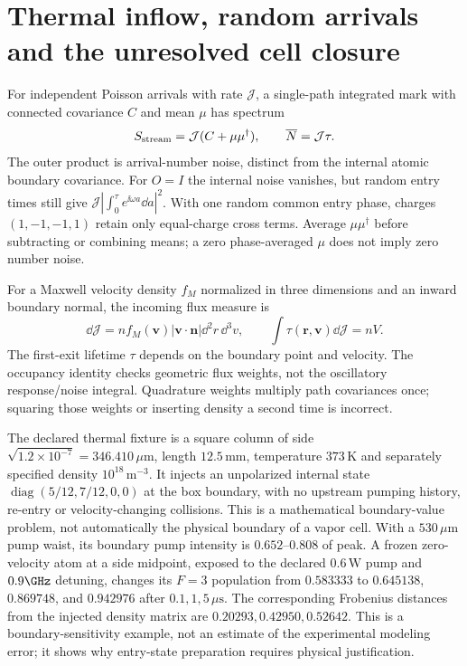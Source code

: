 \section{Thermal inflow, random arrivals and the unresolved cell closure}
\label{sec:gc-ensemble}

For independent Poisson arrivals with rate $\mathcal J$, a single-path
integrated mark with connected covariance $C$ and mean $\mu$ has spectrum
\begin{equation}
 S_{\rm stream}=\mathcal J(C+\mu\mu^\dagger),\qquad
 \overline N=\mathcal J\tau.
 \label{eq:gc-arrival-noise}
\end{equation}
The outer product is arrival-number noise, distinct from the internal atomic
boundary covariance. For $O=I$ the internal noise vanishes, but random entry
times still give $\mathcal J|\int_0^\tau e^{\ii\omega a}\dd a|^2$.
With one random common entry phase, charges $(1,-1,-1,1)$ retain only
equal-charge cross terms. Average $\mu\mu^\dagger$ before subtracting or
combining means; a zero phase-averaged $\mu$ does not imply zero number noise.

For a Maxwell velocity density $f_M$ normalized in three dimensions and an
inward boundary normal, the incoming flux measure is
\begin{equation}
 \dd\mathcal J=n f_M(\mathbf v)|\mathbf v\cdot\mathbf n|
   \dd^2r\,\dd^3v,\qquad
 \int\tau(\mathbf r,\mathbf v)\dd\mathcal J=nV.
 \label{eq:gc-thermal-flux}
\end{equation}
The first-exit lifetime $\tau$ depends on the boundary point and velocity.
The occupancy identity checks geometric flux weights, not the oscillatory
response/noise integral. Quadrature weights multiply path covariances once;
squaring those weights or inserting density a second time is incorrect.

The declared thermal fixture is a square column of side
$\sqrt{1.2\times10^{-7}}=346.410\,\mu\mathrm m$, length $12.5\,\mathrm{mm}$,
temperature $373\,\mathrm K$ and separately specified density
$10^{18}\,\mathrm{m}^{-3}$. It injects an unpolarized internal state
$\operatorname{diag}(5/12,7/12,0,0)$ at the box boundary, with no upstream
pumping history, re-entry or velocity-changing collisions. This is a
mathematical boundary-value problem, not automatically the physical boundary
of a vapor cell. With a $530\,\mu\mathrm m$ pump waist, its boundary pump
intensity is $0.652$--$0.808$ of peak. A frozen zero-velocity atom at a side
midpoint, exposed to the declared $0.6\,\mathrm W$ pump and $0.9\GHz$
detuning, changes its $F=3$ population from $0.583333$ to $0.645138$,
$0.869748$, and $0.942976$ after $0.1,1,5\,\mu\mathrm s$. The corresponding
Frobenius distances from the injected density matrix are $0.20293,0.42950,
0.52642$. This is a boundary-sensitivity example, not an estimate of the
experimental modeling error; it shows why entry-state preparation requires
physical justification.

